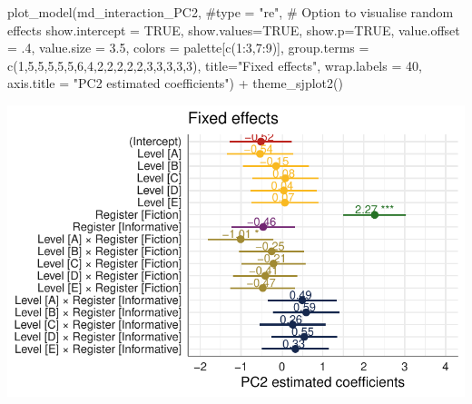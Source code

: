 \documentclass[
  letterpaper,
  DIV=11,
  numbers=noendperiod]{scrreprt}
\newenvironment{Shaded}{\begin{snugshade}}{\end{snugshade}}
\newcommand{\AttributeTok}[1]{\textcolor[rgb]{0.40,0.45,0.13}{#1}}
\newcommand{\CommentTok}[1]{\textcolor[rgb]{0.37,0.37,0.37}{#1}}
\newcommand{\ConstantTok}[1]{\textcolor[rgb]{0.56,0.35,0.01}{#1}}
\newcommand{\DecValTok}[1]{\textcolor[rgb]{0.68,0.00,0.00}{#1}}
\newcommand{\FloatTok}[1]{\textcolor[rgb]{0.68,0.00,0.00}{#1}}
\newcommand{\FunctionTok}[1]{\textcolor[rgb]{0.28,0.35,0.67}{#1}}
\newcommand{\NormalTok}[1]{\textcolor[rgb]{0.00,0.23,0.31}{#1}}
\newcommand{\SpecialCharTok}[1]{\textcolor[rgb]{0.37,0.37,0.37}{#1}}
\newcommand{\StringTok}[1]{\textcolor[rgb]{0.13,0.47,0.30}{#1}}
\begin{document}
\begin{Shaded}
\begin{Highlighting}[]
\FunctionTok{plot\_model}\NormalTok{(md\_interaction\_PC2, }
           \CommentTok{\#type = "re", \# Option to visualise random effects }
           \AttributeTok{show.intercept =} \ConstantTok{TRUE}\NormalTok{,}
           \AttributeTok{show.values=}\ConstantTok{TRUE}\NormalTok{, }
           \AttributeTok{show.p=}\ConstantTok{TRUE}\NormalTok{,}
           \AttributeTok{value.offset =}\NormalTok{ .}\DecValTok{4}\NormalTok{,}
           \AttributeTok{value.size =} \FloatTok{3.5}\NormalTok{,}
           \AttributeTok{colors =}\NormalTok{ palette[}\FunctionTok{c}\NormalTok{(}\DecValTok{1}\SpecialCharTok{:}\DecValTok{3}\NormalTok{,}\DecValTok{7}\SpecialCharTok{:}\DecValTok{9}\NormalTok{)],}
           \AttributeTok{group.terms =} \FunctionTok{c}\NormalTok{(}\DecValTok{1}\NormalTok{,}\DecValTok{5}\NormalTok{,}\DecValTok{5}\NormalTok{,}\DecValTok{5}\NormalTok{,}\DecValTok{5}\NormalTok{,}\DecValTok{5}\NormalTok{,}\DecValTok{6}\NormalTok{,}\DecValTok{4}\NormalTok{,}\DecValTok{2}\NormalTok{,}\DecValTok{2}\NormalTok{,}\DecValTok{2}\NormalTok{,}\DecValTok{2}\NormalTok{,}\DecValTok{2}\NormalTok{,}\DecValTok{3}\NormalTok{,}\DecValTok{3}\NormalTok{,}\DecValTok{3}\NormalTok{,}\DecValTok{3}\NormalTok{,}\DecValTok{3}\NormalTok{), }
           \AttributeTok{title=}\StringTok{"Fixed effects"}\NormalTok{,}
           \AttributeTok{wrap.labels =} \DecValTok{40}\NormalTok{,}
           \AttributeTok{axis.title =} \StringTok{"PC2 estimated coefficients"}\NormalTok{) }\SpecialCharTok{+}
  \FunctionTok{theme\_sjplot2}\NormalTok{() }
\end{Highlighting}
\end{Shaded}

\includegraphics{AppendixH_files/figure-pdf/Dim2fixed-1.pdf}
\end{document}
